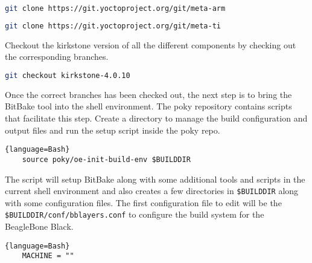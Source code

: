 \begin{lstlisting}[language=Bash]
	git clone https://git.yoctoproject.org/git/meta-arm
\end{lstlisting}

\begin{lstlisting}[language=Bash]
	git clone https://git.yoctoproject.org/git/meta-ti
\end{lstlisting}

Checkout the kirkstone version of all the different components by checking out the corresponding branches.

\begin{lstlisting}[language=Bash]
	git checkout kirkstone-4.0.10
\end{lstlisting}

Once the correct branches has been checked out, the next step is to bring the BitBake tool into the shell environment. The poky repository contains scripts that facilitate this step. Create a directory to manage the build configuration and output files and run the setup script inside the poky repo.

\begin{lstlisting}{language=Bash}
	source poky/oe-init-build-env $BUILDDIR
\end{lstlisting}

The script will setup BitBake along with some additional tools and scripts in the current shell environment and also creates a few directories in \texttt{\$BUILDDIR} along with some configuration files. The first configuration file to edit will be the \texttt{\$BUILDDIR/conf/bblayers.conf} to configure the build system for the BeagleBone Black.

\begin{lstlisting}{language=Bash}
	MACHINE = ""
\end{lstlisting}

